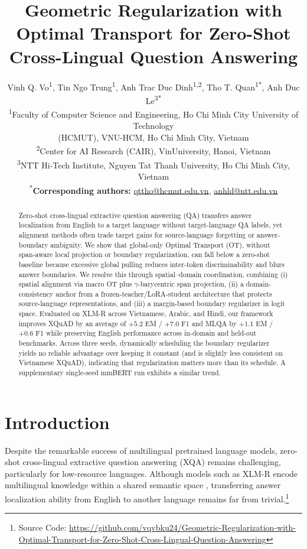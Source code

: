 \documentclass[11pt]{article}
\title{Geometric Regularization with Optimal Transport for Zero-Shot Cross-Lingual Question Answering}
\author{
  Vinh Q. Vo\textsuperscript{1}, Tin Ngo Trung\textsuperscript{1}, Anh Trac Duc Dinh\textsuperscript{1,2}, Tho T. Quan\textsuperscript{1*}, Anh Duc Le\textsuperscript{3*} \\[1ex]
  \textsuperscript{1}Faculty of Computer Science and Engineering, Ho Chi Minh City University of Technology \\
  (HCMUT), VNU-HCM, Ho Chi Minh City, Vietnam \\
  \textsuperscript{2}Center for AI Research (CAIR), VinUniversity, Hanoi, Vietnam \\
  \textsuperscript{3}NTT Hi-Tech Institute, Nguyen Tat Thanh University, Ho Chi Minh City, Vietnam \\
  \textsuperscript{*}\textbf{Corresponding authors:} \href{mailto:qttho@hcmut.edu.vn}{qttho@hcmut.edu.vn}, \href{mailto:anhld@ntt.edu.vn}{anhld@ntt.edu.vn}
}
\begin{document}
\raggedbottom
\maketitle
\begin{abstract}

Zero-shot cross-lingual extractive question answering (QA) transfers answer localization from English to a target language without target-language QA labels, yet alignment methods often trade target gains for source-language forgetting or answer-boundary ambiguity. We show that global-only Optimal Transport (OT), without span-aware local projection or boundary regularization, can fall below a zero-shot baseline because excessive global pulling reduces inter-token discriminability and blurs answer boundaries. We resolve this through spatial--domain coordination, combining (i) spatial alignment via macro OT plus $\gamma$-barycentric span projection, (ii) a domain-consistency anchor from a frozen-teacher/LoRA-student architecture that protects source-language representations, and (iii) a margin-based boundary regularizer in logit space. Evaluated on XLM-R across Vietnamese, Arabic, and Hindi, our framework improves XQuAD by an average of $+5.2$ EM / $+7.0$ F1 and MLQA by $+1.1$ EM / $+0.6$ F1 while preserving English performance across in-domain and held-out benchmarks. Across three seeds, dynamically scheduling the boundary regularizer yields no reliable advantage over keeping it constant (and is slightly less consistent on Vietnamese XQuAD), indicating that regularization matters more than its schedule. A supplementary single-seed mmBERT run exhibits a similar trend.

\end{abstract}

\section{Introduction}
\label{sec:intro}
Despite the remarkable success of multilingual pretrained language models, zero-shot cross-lingual extractive question answering (XQA) remains challenging, particularly for low-resource languages. Although models such as XLM-R encode multilingual knowledge within a shared semantic space \citep{wu-dredze-2019-beto}, transferring answer localization ability from English to another language remains far from trivial.\footnote{Source Code: \url{https://github.com/vqvbku24/Geometric-Regularization-with-Optimal-Transport-for-Zero-Shot-Cross-Lingual-Question-Answering}}
\end{document}
